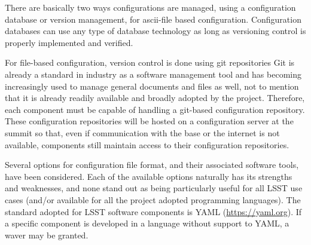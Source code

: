 There are basically two ways configurations are managed, using a configuration database or version management, for 
ascii-file based configuration. Configuration databases can use any type of database technology as long as versioning 
control is properly implemented and verified. 

For file-based configuration, version control is done using git repositories
Git is already a standard in industry as a software management tool and has becoming increasingly used 
to manage general documents and files as well, not to mention that it is already readily available and broadly adopted by the 
project. Therefore, each component must be capable of handling a git-based configuration repository.
These configuration repositories will be hosted on a configuration server at the summit so that, even if communication with the 
base or the internet is not available, components still maintain access to their configuration repositories. 

Several options for configuration file format, and their associated software tools, have been considered. Each of the 
available options naturally has its strengths and weaknesses, and none stand out as being particularly useful for all LSST 
use cases (and/or available for all the project adopted programming languages). The standard adopted for LSST 
software components is YAML (\url{https://yaml.org}). If a specific component is developed in a language without support
to YAML, a waver may be granted.









